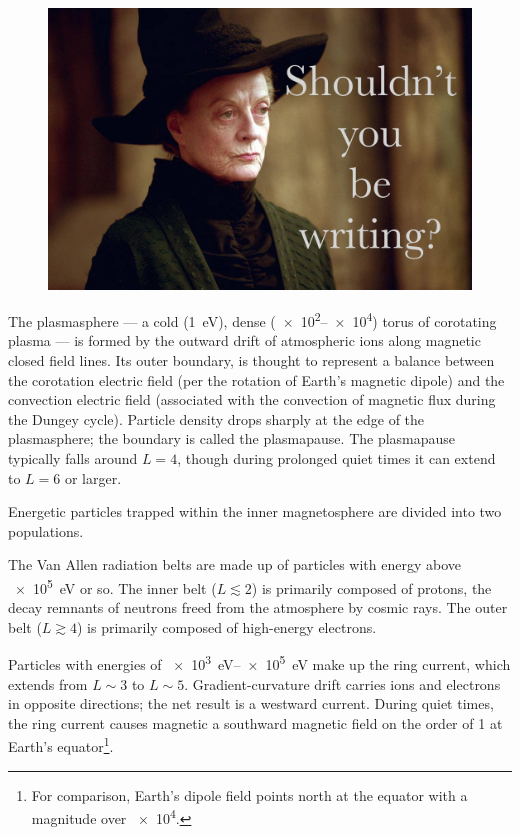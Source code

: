 \begin{figure}[!htb]
    \centering
    \includegraphics[width=\textwidth]{figures/placeholder.jpg}
    \caption[Inner Magnetosphere Cutaway]{
    }
    \label{fig_inner_magnetosphere}
\end{figure}

The plasmasphere --- a cold (\about\SI{1}{\eV}), dense (\SIrange{e2}{e4}{\percc}) torus of corotating plasma --- is formed by the outward drift of atmospheric ions along magnetic closed field lines. Its outer boundary, is thought to represent a balance between the corotation electric field (per the rotation of Earth's magnetic dipole) and the convection electric field (associated with the convection of magnetic flux during the Dungey cycle). Particle density drops sharply at the edge of the plasmasphere; the boundary is called the plasmapause. The plasmapause typically falls around $L=4$, though during prolonged quiet times it can extend to $L=6$ or larger. 

Energetic particles trapped within the inner magnetosphere are divided into two populations. 

The Van Allen radiation belts are made up of particles with energy above \SI{e5}{\eV} or so. The inner belt ($L\lesssim2$) is primarily composed of protons, the decay remnants of neutrons freed from the atmosphere by cosmic rays. The outer belt ($L\gtrsim4$) is primarily composed of high-energy electrons. 

Particles with energies of \SIrange{e3}{e5}{\eV} make up the ring current, which extends from $L\sim3$ to $L\sim5$. Gradient-curvature drift carries ions and electrons in opposite directions; the net result is a westward current. During quiet times, the ring current causes magnetic a southward magnetic field on the order of \SI{1}{\nT} at Earth's equator\footnote{For comparison, Earth's dipole field points north at the equator with a magnitude over \SI{e4}{\nT}. }. 

